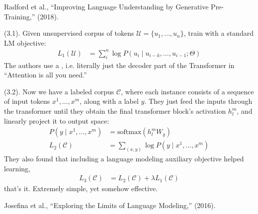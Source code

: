 \documentclass[11pt]{article}
\begin{document}
\vspace{-1em}
{\footnotesize Radford et al., ``Improving Language Understanding by Generative Pre-Training,'' (2018).}

\p {} (3.1). Given unsupervised corpus of tokens $\mathcal{U} = \{u_1, \ldots, u_n \}$, train with a standard LM objective:
\begin{align}
L_1(\mathcal U)
&= \sum_i^n \log P(u_i \mid u_{i-k}, \ldots, u_{i-1}; \Theta)
\end{align}
The authors use a , i.e. literally just the decoder part of the Transformer in ``Attention is all you need.'' 

\myspace
\p {} (3.2). Now we have a labeled corpus $\mathcal C$, where each instance consists of a sequence of input tokens $x^1, \ldots, x^m$, along with a label $y$. They just feed the inputs through the transformer until they obtain the final transformer block's activation $h_l^m$, and linearly project it to output space:
\begin{align}
P(y \mid x^1, \ldots, x^m )	
&= \text{softmax}(h_l^m W_y) \\
L_2(\mathcal C)
&= \sum_{(x,y)} \log P(y \mid x^1, \ldots, x^m)
\end{align}
They also found that including a language modeling auxiliary objective helped learning,
\begin{align}
L_3(\mathcal C)
&= L_2(\mathcal C) + \lambda L_1(\mathcal C)
\end{align}
\textellipsis that's it. Extremely simple, yet somehow effective.


\vspace{-1em}
{\footnotesize Josefina et al., ``Exploring the Limits of Language Modeling,'' (2016).}
\end{document}
